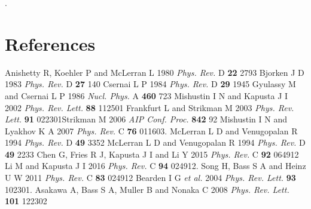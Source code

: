 \documentclass[a4paper]{jpconf}
\begin{document}
.

\section*{References}
\begin{thebibliography}{20}
 Anishetty R, Koehler P and McLerran L 1980 {\it Phys. Rev.} D {\bf 22} 2793
 Bjorken J D 1983 {\it Phys. Rev.} D {\bf 27} 140
 Csernai L P 1984 {\it Phys. Rev.} D {\bf 29} 1945
 Gyulassy M and Csernai L P 1986 {\it Nucl. Phys.} A {\bf 460} 723
 Mishustin I N and Kapusta J I 2002 {\it Phys. Rev. Lett.} {\bf 88} 112501
 Frankfurt L and Strikman M 2003 {\it Phys. Rev. Lett.} {\bf 91} 022301\nonum Strikman M 2006 {\it AIP Conf. Proc.} {\bf 842} 92
 Mishustin I N and Lyakhov K A 2007 {\it Phys. Rev.} C {\bf 76} 011603.
 McLerran L D and Venugopalan R 1994 {\it Phys. Rev.} D {\bf 49} 3352 \nonum McLerran L D and Venugopalan R 1994 {\it Phys. Rev.} D {\bf 49} 2233 
 Chen G, Fries R J, Kapusta J I and Li Y 2015 {\it Phys. Rev.} C {\bf 92} 064912
 Li M and Kapusta J I 2016 {\it Phys. Rev.} C {\bf 94} 024912.
 Song H, Bass S A and Heinz U W 2011 {\it Phys. Rev.} C {\bf 83} 024912
 Bearden I G {\it et al.} 2004 {\it Phys. Rev. Lett.} {\bf 93} 102301.
 Asakawa A, Bass S A, Muller B and Nonaka C 2008 {\it Phys. Rev. Lett.} {\bf101} 122302
\end{thebibliography}
\end{document}
